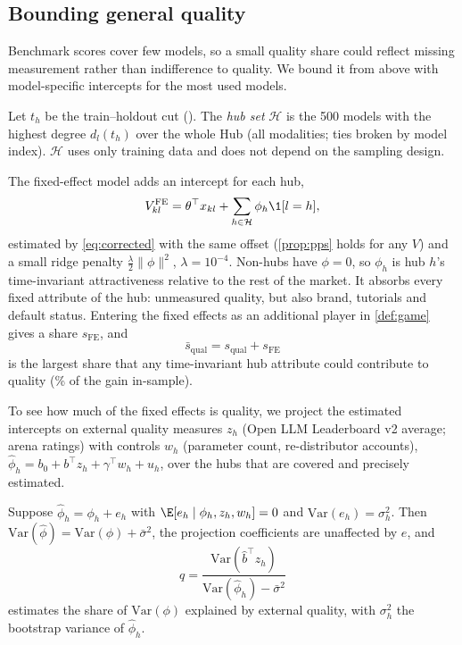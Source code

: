 \subsection{Bounding general quality}
\label{sec:bounds}

Benchmark scores cover few models, so a small quality share could reflect missing measurement rather than
indifference to quality. We bound it from above with model-specific intercepts for the most used models.

\begin{definition}[Hubs]
\label{def:hubs}
Let $t_h$ be the train--holdout cut (\tHold). The \emph{hub set} $\mathcal H$ is the 500 models with the highest
degree $d_l(t_h)$ over the whole Hub (all modalities; ties broken by model index). $\mathcal H$ uses only training
data and does not depend on the sampling design.
\end{definition}

The fixed-effect model adds an intercept for each hub,
\begin{equation}
  V^{\mathrm{FE}}_{kl} = \theta^\top x_{kl} + \sum_{h \in \mathcal H} \phi_h \1[l = h],
  \label{eq:fe}
\end{equation}
estimated by \eqref{eq:corrected} with the same offset (\cref{prop:pps} holds for any $V$) and a small ridge penalty
$\frac{\lambda}{2}\|\phi\|^2$, $\lambda = 10^{-4}$. Non-hubs have $\phi = 0$, so $\phi_h$ is hub $h$'s
time-invariant attractiveness relative to the rest of the market. It absorbs every fixed attribute of the hub:
unmeasured quality, but also brand, tutorials and default status. Entering the fixed effects as an additional player
in \cref{def:game} gives a share $s_{\mathrm{FE}}$, and
\[
  \bar s_{\mathrm{qual}} = s_{\mathrm{qual}} + s_{\mathrm{FE}}
\]
is the largest share that any time-invariant hub attribute could contribute to quality (\feShare\% of the gain
in-sample).

To see how much of the fixed effects is quality, we project the estimated intercepts on external quality measures
$z_h$ (Open LLM Leaderboard v2 average; arena ratings) with controls $w_h$ (parameter count, re-distributor accounts),
$\hat\phi_h = b_0 + b^\top z_h + \gamma^\top w_h + u_h$, over the \extHubs{} hubs that are covered and precisely
estimated.

\begin{lemma}
\label{lem:noise}
Suppose $\hat\phi_h = \phi_h + e_h$ with $\E[e_h \mid \phi_h, z_h, w_h] = 0$ and $\mathrm{Var}(e_h) = \sigma_h^2$.
Then $\mathrm{Var}(\hat\phi) = \mathrm{Var}(\phi) + \bar\sigma^2$, the projection coefficients are unaffected by $e$,
and
\[
  q = \frac{\mathrm{Var}(\hat b^\top z_h)}{\mathrm{Var}(\hat\phi_h) - \bar\sigma^2}
\]
estimates the share of $\mathrm{Var}(\phi)$ explained by external quality, with $\sigma_h^2$ the bootstrap variance
of $\hat\phi_h$.
\end{lemma}

